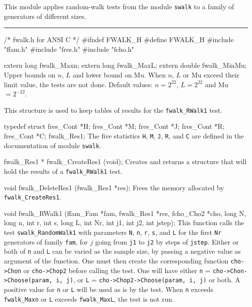 
This module applies random-walk tests from the module {\tt swalk}
to a family of generators of different sizes.

\bigskip
\hrule
\code\hide
/* fwalk.h  for ANSI C */
#ifndef FWALK_H
#define FWALK_H
\endhide
#include "ffam.h"
#include "fres.h"
#include "fcho.h"


extern long fwalk_Maxn;
extern long fwalk_MaxL;
extern double fwalk_MinMu;
\endcode
\tab
  Upper bounds on $n$, $L$ and lower bound on Mu.
  When $n$, $L$ or Mu exceed their limit value, the tests are not done.
  Default values: $n = 2^{22}$, $L = 2^{22}$ and Mu ${} = 2^{-22}$.
\endtab


\ifdetailed  %


This structure is used to keep tables of results for the
 {\tt fwalk\_RWalk1} test.
\code

typedef struct {
   fres_Cont *H;
   fres_Cont *M;
   fres_Cont *J;
   fres_Cont *R;
   fres_Cont *C;
} fwalk_Res1;
\endcode
 \tab The five statistics {\tt H}, {\tt M}, {\tt J}, {\tt R}, and {\tt C}
  are defined in the documentation of module {\tt swalk}.
 \endtab
\code


fwalk_Res1 * fwalk_CreateRes1 (void);
\endcode
 \tab 
  Creates and returns a structure that will hold the results
  of a {\tt fwalk\_RWalk1} test. 
 \endtab
\code


void fwalk_DeleteRes1 (fwalk_Res1 *res);
\endcode
 \tab 
  Frees the memory allocated by {\tt fwalk\_CreateRes1}.
 \endtab

\fi %


\code

void fwalk_RWalk1 (ffam_Fam *fam, fwalk_Res1 *res, fcho_Cho2 *cho,
                   long N, long n, int r, int s, long L,
                   int Nr, int j1, int j2, int jstep);
\endcode
\tab This function calls the test {\tt swalk\_RandomWalk1} with
  parameters {\tt N}, {\tt n},  {\tt r},  {\tt s}, and {\tt L} for the
  first {\tt Nr} generators of family {\tt fam}, for $j$ going from
  {\tt j1} to {\tt j2} by steps of {\tt jstep}. Either or both of  {\tt n}
  and {\tt L} can be varied as the sample size, by passing a negative value as
  argument of the function. One must then create the corresponding function
  {\tt cho->Chon} or {\tt cho->Chop2} before calling the test.
  One will have either {\tt n} = {\tt cho->Chon->Choose(param, i, j)},
  or {\tt L} = {\tt cho->Chop2->Choose(param, i, j)} or both. A positive
  value for {\tt n} or {\tt L} will be used as is by the test. When {\tt n}
  exceeds {\tt fwalk\_Maxn} or {\tt L} exceeds {\tt fwalk\_MaxL}, 
  the test is not run.
\endtab
\code


